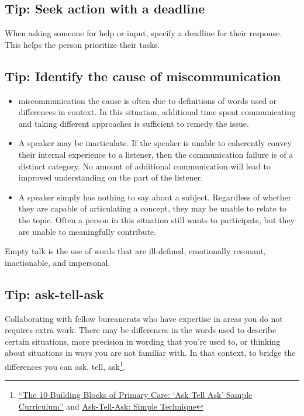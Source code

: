 \subsection*{Tip: Seek action with a deadline}

When asking someone for help or input, specify a deadline for their response. This helps the person prioritize their tasks.

\subsection*{Tip: Identify the cause of miscommunication}

\begin{itemize}
    \item miscommunication the cause is often due to definitions of words used or differences in context. In this situation, additional time spent communicating and taking different approaches is sufficient to remedy the issue.
\item A speaker may be inarticulate. If the speaker is unable to coherently convey their internal experience to a listener, then the communication failure is of a distinct category. No amount of additional communication will lead to improved understanding on the part of the listener.
\item A speaker simply has nothing to say about a subject. Regardless of whether they are capable of articulating a concept, they may be unable to relate to the topic. Often a person in this situation still wants to participate, but they are unable to meaningfully contribute. 
\end{itemize}
Empty talk is the use of words that are ill-defined, emotionally resonant, inactionable, and impersonal.

\subsection*{Tip: ask-tell-ask}

Collaborating with fellow bureaucrats who have expertise in areas you do not requires extra work. There may be differences in the words used to describe certain situations, more precision in wording that you're used to, or thinking about situations in ways you are not familiar with. In that context, to bridge the differences you can ask, tell, ask\footnote{\href{https://cepc.ucsf.edu/sites/cepc.ucsf.edu/files/Curriculum_sample_14-0602.pdf}{``The 10 Building Blocks of Primary Care: `Ask Tell Ask' Sample Curriculum''} and \href{https://www.the-hospitalist.org/hospitalist/article/125126/qi-initiatives/ask-tell-ask-simple-technique-can-help-hospitalists}{Ask-Tell-Ask: Simple Technique}}. 

